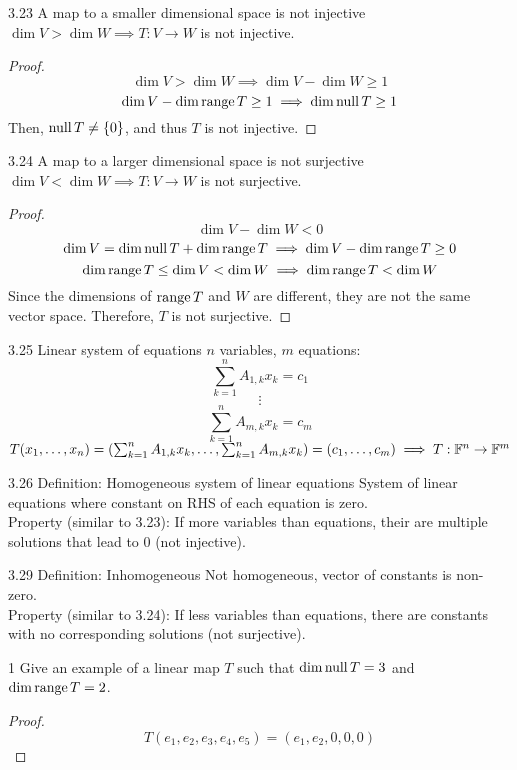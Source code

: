 \documentclass[12pt, letterpaper]{article}
\begin{document}
\begin{imp}
{3.23 A map to a smaller dimensional space is not injective}
$\dim V>\dim W\implies T:V\to W$ is not injective.
\begin{proof}
$$\dim V>\dim W\implies \dim V-\dim W\geq 1$$
$$\dim V-\dim\operatorname{range} T\geq1\implies \dim\operatorname{null} T\geq 1$$
Then, $\operatorname{null} T\neq\{0\}$, and thus $T$ is not injective.
\end{proof}
\end{imp}

\begin{imp}
{3.24 A map to a larger dimensional space is not surjective}
$\dim V<\dim W\implies T:V\to W$ is not surjective.
\begin{proof}
$$\dim V-\dim W<0$$
$$\dim V=\dim\operatorname{null} T+\dim\operatorname{range} T\implies\dim V-\dim\operatorname{range} T\geq0$$
$$\dim\operatorname{range} T\leq\dim V<\dim W\implies\dim\operatorname{range} T<\dim W$$
Since the dimensions of $\operatorname{range} T$ and $W$ are different, they are not the same vector space.
Therefore, $T$ is not surjective.
\end{proof}
\end{imp}

\begin{imp}
{3.25 Linear system of equations}
$n$ variables, $m$ equations:
$$\sum_{k=1}^nA_{1,k}x_k = c_1$$
$$\vdots$$
$$\sum_{k=1}^nA_{m,k}x_k = c_m$$
$T(x_1,\dots,x_n)=(
\sum_{k=1}^nA_{1,k}x_k,
\dots,
\sum_{k=1}^nA_{m,k}x_k)=(c_1,\dots,c_m)\implies
T:\mathbb{F}^n\to\mathbb{F}^m$

\end{imp}

\begin{imp}
{3.26 Definition: Homogeneous system of linear equations}
System of linear equations where constant on RHS
of each equation is zero.
\\Property (similar to 3.23): If more variables than
equations, their are multiple solutions that lead to 0 (not injective).
\end{imp}

\begin{imp}
{3.29 Definition: Inhomogeneous}
 Not homogeneous, vector of constants is non-zero.
\\Property (similar to 3.24): If less variables than
equations, there are constants with no corresponding solutions (not surjective).
\end{imp}

\begin{problem}
{1} Give an example of a linear map $T$ such that 
$\dim\operatorname{null} T=3$ and $\dim\operatorname{range} T=2$.
\end{problem}
\begin{proof}
$$T(e_1,e_2,e_3,e_4,e_5)=(e_1,e_2,0,0,0)$$
\end{proof}
\end{document}
